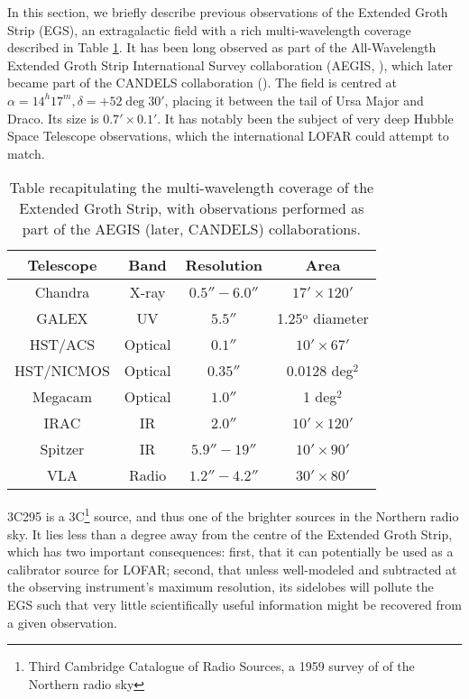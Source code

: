 \pg
In this section, we briefly describe previous observations of the Extended Groth Strip (EGS), an extragalactic field with a rich multi-wavelength coverage described in Table \ref{table.EGS.observation}. It has been long observed as part of the All-Wavelength Extended Groth Strip International Survey collaboration (AEGIS, ), which later became part of the CANDELS collaboration (). The field is centred at $\alpha=14^h17^m,\delta=+52\deg 30'$, placing it between the tail of Ursa Major and Draco. Its size is $0.7'\times 0.1'$. It has notably been the subject of very deep Hubble Space Telescope observations, which the international LOFAR could attempt to match. 

\begin{table}[h!]
\begin{tabular}{cccc}
Telescope    & Band    & Resolution  & Area \\\hline
Chandra      & X-ray   & $0.5''-6.0''$ & $17'\times 120'$ \\
GALEX        & UV      & $5.5''      $ & 1.25$^\text{o}$ diameter \\
HST/ACS      & Optical & $0.1''      $ & $10' \times 67'$\\
HST/NICMOS   & Optical & $0.35''     $ & 0.0128 deg$^2$\\
Megacam      & Optical & $1.0''      $ & 1 deg$^2$\\
IRAC         & IR      & $2.0''      $ & $10' \times 120'$ \\
Spitzer      & IR      & $5.9''-19'' $ & $10'\times 90'$\\
VLA          & Radio   & $1.2''-4.2''$ & $30' \times 80'$
\end{tabular}
\caption{\label{table.EGS.observation}Table recapitulating the multi-wavelength coverage of the Extended Groth Strip, with observations performed as part of the AEGIS (later, CANDELS) collaborations.}
\end{table}

\pg
3C295 is a 3C\footnote{Third Cambridge Catalogue of Radio Sources, a 1959 survey of of the Northern radio sky} source, and thus one of the brighter sources in the Northern radio sky. It lies less than a degree away from the centre of the Extended Groth Strip, which has two important consequences: first, that it can potentially be used as a calibrator source for LOFAR; second, that unless well-modeled and subtracted at the observing instrument's maximum resolution, its sidelobes will pollute the EGS such that very little scientifically useful information might be recovered from a given observation.

